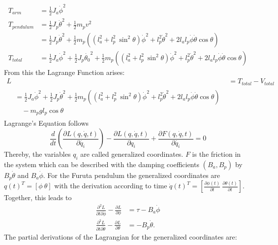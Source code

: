 \begin{align*}
T_{arm}&=\frac{1}{2}J_a\dot{\phi}^2\\
T_{pendulum}&=\frac{1}{2}J_p\dot{\theta}^2+\frac{1}{2}m_pv^2\\
&= \frac{1}{2}J_p\dot{\theta}^2+\frac{1}{2}m_p\left((l_a^2+l_p^2\ 
\sin^2\theta)\dot{\phi}^2+l_p^2\dot{\theta}^2+2l_al_p\dot{\phi}\dot{\theta}\cos 
\theta\right)\\
T_{total}&= 
\frac{1}{2}J_a\dot{\phi}^2+\frac{1}{2}J_p\dot{\theta_0}^2+\frac{1}{2}m_p\left((l_a^2+l_p^2\
\sin^2\theta)\dot{\phi}^2+l_p^2\dot{\theta}^2+2l_al_p\dot{\phi}\dot{\theta}\cos 
\theta\right)
\end{align*}
From this the Lagrange Function arises:
\begin{align*}
L &=T_{total}-V_{total}\\
\begin{split}&=\frac{1}{2}J_a\dot{\phi}^2+\frac{1}{2}J_p\dot{\theta}^2+\frac{1}{2}m_p\left((l_a^2+l_p^2\
\sin^2\theta)\dot{\phi}^2+l_p^2\dot{\theta}^2+2l_al_p\dot{\phi}\dot{\theta}\cos 
\theta\right) \\&\quad - m_pgl_{p}\cos\theta\end{split}
\end{align*}
 Lagrange's 
Equation follows \[ 
\frac{d}{dt}\left(\frac{\partial L(q, \dot{q},t)}{\partial 
	\dot{q_i}}\right)-\frac{\partial 
	L(q, \dot{q},t)}{\partial 
	q_i}+\frac{\partial F(q, \dot{q}, t)}{\partial \dot{q_i}} =0\] Thereby, 
	the 
	variables 
	$q_i$ are called 
	generalized coordinates. $F$ is the friction in 
	the system which can be described with the damping coefficients 
	$(B_a, B_p)$ by $B_p\dot{\theta}$ and $ 
	B_a\dot{\phi}$.
	For 
the Furuta pendulum the generalized coordinates are $q(t)^T=[\phi \ \theta]$ 
with 
the derivation according to time $\dot{q}(t)^T = 
\left[\frac{\partial 
	\phi(t)}{\partial t}\ \frac{\partial \theta(t)}{\partial t} \right]$. 
	Together, this
	leads 
to 
\begin{align*}
\frac{\partial^2 L}{\partial t\partial \dot{\phi}}-\frac{\partial 
	L}{\partial \phi}&=\tau - B_a\dot{\phi}\\
\frac{\partial^2 L}{\partial t\partial \dot{\theta}}-\frac{\partial 
	L}{\partial \theta}&=-B_p\dot{\theta}.
\end{align*}
The partial derivations of the Lagrangian for the generalized coordinates are:

